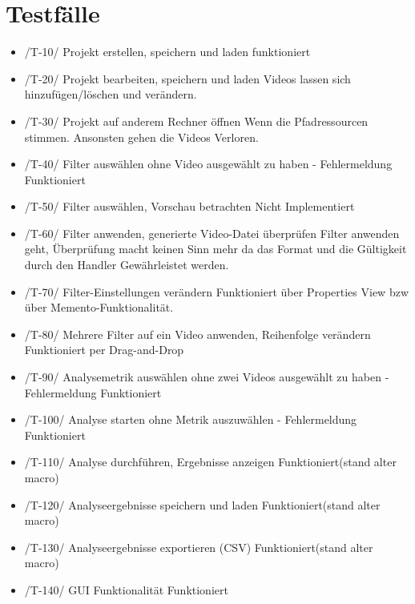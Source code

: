 \section{Testfälle}
\begin{itemize}
\item /T-10/ Projekt erstellen, speichern und laden \newline
funktioniert
\item /T-20/ Projekt bearbeiten, speichern und laden\newline
Videos lassen sich hinzufügen/löschen und verändern.
\item /T-30/ Projekt auf anderem Rechner öffnen\newline
Wenn die Pfadressourcen stimmen. Ansonsten gehen die Videos Verloren.
\item /T-40/ Filter auswählen ohne Video ausgewählt zu haben - Fehlermeldung \newline
Funktioniert
\item /T-50/ Filter auswählen, Vorschau betrachten \newline
Nicht Implementiert
\item /T-60/ Filter anwenden, generierte Video-Datei überprüfen \newline
Filter anwenden geht, Überprüfung macht keinen Sinn mehr da das Format und die Gültigkeit durch den Handler Gewährleistet werden.
\item /T-70/ Filter-Einstellungen verändern \newline
Funktioniert über Properties View bzw über Memento-Funktionalität.
\item /T-80/ Mehrere Filter auf ein Video anwenden, Reihenfolge verändern \newline
Funktioniert per Drag-and-Drop
\item /T-90/ Analysemetrik auswählen ohne zwei Videos ausgewählt zu haben - Fehlermeldung \newline
Funktioniert
\item /T-100/ Analyse starten ohne Metrik auszuwählen - Fehlermeldung \newline
Funktioniert
\item /T-110/ Analyse durchführen, Ergebnisse anzeigen \newline
Funktioniert(stand alter macro)
\item /T-120/ Analyseergebnisse speichern und laden \newline
Funktioniert(stand alter macro)
\item /T-130/ Analyseergebnisse exportieren (CSV) \newline
Funktioniert(stand alter macro)
\item /T-140/ GUI Funktionalität \newline
Funktioniert
\end{itemize}